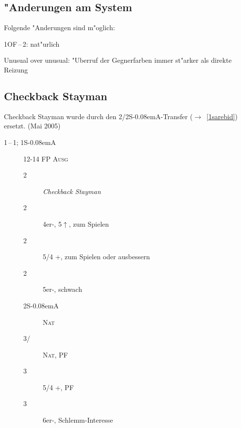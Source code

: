 \documentclass[11pt,german,twocolumn]{scrartcl}
\def\pik{\nobreak\hspace{\cardskip}\Sp\xspace}
\def\coe{\nobreak\hspace{\cardskip}\He\xspace}
\def\kar{\nobreak\hspace{\cardskip}\Di\xspace}
\def\tre{\nobreak\hspace{\cardskip}\Cl\xspace}
\def\pi{\Sp\xspace}
\def\co{\He\xspace}
\def\mi{\hspace{\cardskip}\Cl{}/\Di\xspace}
\def\ra{$\rightarrow$\xspace}
\def\pl{$\uparrow$\xspace}
\def\ofa{\nobreak\textsf{OF}\xspace}
\def\sa{\nobreak\textsf{S\kern-0.08emA}\xspace}
\def\SA{\nobreak\hspace{\cardskip}\sa}
\def\sep{\,--\,}
\newcommand{\conv}[1]{\emph{#1}}
\def\bal{\textsc{Ausg}\xspace}
\def\nat{\textsc{Nat}\xspace}
\def\pf{\textsc{PF}\xspace}
\def\bdsc{\begin{description}}
\def\edsc{\end{description}}
\begin{document}
\begin{appendix}
\section{"Anderungen am System}

Folgende "Anderungen sind m"oglich:
%
\begin{compactitem}
\item 1\ofa{}\sep2\tre: nat"urlich
\item Unusual over unusual: "Uberruf der Gegnerfarben immer st"arker als direkte Reizung
\end{compactitem}

\subsection{Checkback Stayman}

Checkback Stayman wurde durch den 2\tre/2\SA-Transfer (\ra~\ref{1sarebid})
ersetzt. (Mai 2005)

\bdsc
\item[1\tre{}\sep1\pik; 1\SA] 12-14 FP \bal
  \bdsc
  \item[2\tre] \conv{Checkback Stayman}
  \item[2\kar] 4er-\pi, 5\pl{}\kar, zum Spielen
  \item[2\coe] 5/4 \pi{}+\co, zum Spielen oder ausbessern
  \item[2\pik] 5er-\pi, schwach
  \item[2\SA] \nat
  \item[3\mi] \nat, \pf
  \item[3\coe] 5/4 \pi{}+\co, \pf
  \item[3\pik] 6er-\pi, Schlemm-Interesse
  \edsc
\edsc
\end{appendix}
\end{document}
